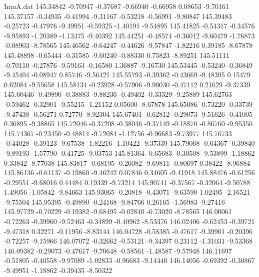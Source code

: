 \begin{filecontents}{ImuA.dat}
 145.34842   -0.70947   -0.37687   -9.66940   -0.66958    0.08653   -9.70161
 145.37157   -0.34935   -0.41994   -9.31167   -0.53218   -0.56991   -9.80847
 145.39483   -0.25723   -0.47976   -9.49951   -0.59325   -1.40191   -9.54895
 145.41825   -0.54317   -0.34576   -9.95893   -1.20389   -1.13475   -9.40392
 145.44251   -0.48574   -0.36012   -9.60479   -1.76873   -0.08903   -8.78565
 145.46562   -0.64247   -0.44626   -9.57847   -1.82216    0.39185   -8.67878
 145.48898   -0.65444   -0.31585   -9.60240   -0.88330    0.75823   -8.89251
 145.51111   -0.70110   -0.27876   -9.59163   -0.16580    1.36887   -9.16730
 145.53445   -0.53240   -0.36849   -9.45404   -0.08947    0.85746   -9.56421
 145.55793   -0.39362   -0.43669   -9.48395    0.15479    0.62084   -9.55658
 145.58134   -0.23928   -0.57906   -9.90030   -0.47112    0.21629   -9.37339
 145.60446   -0.49890   -0.38883   -9.88236   -0.49402   -0.33329   -9.25889
 145.62763   -0.59462   -0.32901   -9.55215   -1.21152    0.05600   -8.67878
 145.65086   -0.73220   -0.33739   -9.47438   -0.56271    0.72770   -8.92304
 145.67401   -0.62812   -0.29073   -9.51626   -0.41005    0.36895   -9.38865
 145.72046   -0.37208   -0.38046   -9.37149   -0.18870   -0.86760   -9.95350
 145.74367   -0.23450   -0.48814   -9.72084   -1.12756   -0.96683   -9.73977
 145.76733   -0.44028   -0.39123   -9.67538   -1.82216   -1.10422   -9.37339
 145.79068   -0.64367   -0.39840   -9.89193   -1.57790   -0.41725   -9.03753
 145.81364   -0.65683   -0.30508   -9.53899   -1.18862    0.33842   -8.77038
 145.83817   -0.68195   -0.26082   -9.69811   -0.80697    0.38422   -8.96884
 145.86136   -0.61137   -0.19860   -9.46242    0.07846    0.34605   -9.41918
 145.88476   -0.61256   -0.29551   -9.68016    0.44484    0.19339   -9.73214
 145.90741   -0.37567   -0.32064   -9.50788    1.49056   -1.05842   -9.84663
 145.93065   -0.20818   -0.43071   -9.63590    1.02495   -2.16521   -9.75504
 145.95395   -0.49890   -0.24168   -9.84766    0.26165   -1.56983   -9.27416
 145.97729   -0.70229   -0.19382   -9.68495   -0.02840   -0.73020   -8.78565
 146.00061   -0.72263   -0.39960   -9.52463   -0.34899   -0.40962   -8.53376
 146.02406   -0.62453   -0.39721   -9.47318    0.32271   -0.11956   -8.83144
 146.04728   -0.58385   -0.47617   -9.39901   -0.20396   -0.72257   -9.15966
 146.07072   -0.32662   -0.53121   -9.34397    0.23112   -1.31031   -9.53368
 146.09382   -0.29073   -0.47617   -9.70648   -0.58561   -1.48587   -9.57948
 146.11697   -0.51805   -0.40558   -9.97089   -1.02833   -0.96683   -9.14440
 146.14056   -0.69392   -0.30867   -9.49951   -1.18862   -0.39435   -8.50322

\end{filecontents}
